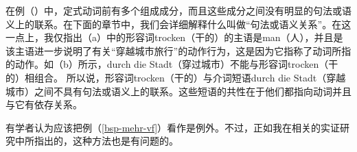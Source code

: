\noindent
在例（）中，定式动词前有多个组成成分，而且这些成分之间没有明显的句法或语义上的联系。在下面的章节中，我们会详细解释什么叫做“句法或语义关系”。在这一点上，我仅指出（a）中的形容词trocken（干的）的主语是man（人），并且是该主语进一步说明了有关“穿越城市旅行”的动作行为，这是因为它指称了动词所指的动作。如（b）所示，durch die Stadt（穿过城市）不能与形容词trocken（干的）相组合。
\eal
{}
\zl
所以说，形容词trocken（干的）与介词短语durch die Stadt（穿越城市）之间不具有句法或语义上的联系。这些短语的共性在于他们都指向动词并且与它有依存关系。

有学者认为应该把例（\ref{bsp-mehr-vf}）看作是例外。不过，正如我在相关的实证研究中所指出的，这种方法也是有问题的\citep{Mueller2003b}。

